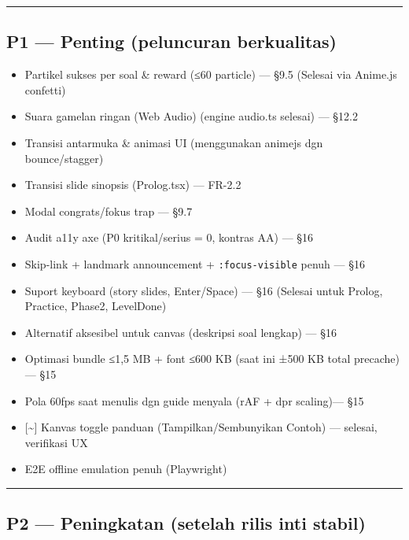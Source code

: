 \documentclass[
  11pt,
]{article}
\providecommand{\tightlist}{%
  \setlength{\itemsep}{0pt}\setlength{\parskip}{0pt}}
\begin{document}
\begin{center}\rule{0.5\linewidth}{0.5pt}\end{center}

\subsection{P1 --- Penting (peluncuran
berkualitas)}\label{p1-penting-peluncuran-berkualitas}

\begin{itemize}
\tightlist
\item[$\boxtimes$]
  Partikel sukses per soal \& reward (≤60 particle) --- §9.5 (Selesai
  via Anime.js confetti)
\item[$\boxtimes$]
  Suara gamelan ringan (Web Audio) (engine audio.ts selesai) --- §12.2
\item[$\boxtimes$]
  Transisi antarmuka \& animasi UI (menggunakan animejs dgn
  bounce/stagger)
\item[$\boxtimes$]
  Transisi slide sinopsis (Prolog.tsx) --- FR-2.2
\item[$\square$]
  Modal congrats/fokus trap --- §9.7
\item[$\boxtimes$]
  Audit a11y axe (P0 kritikal/serius = 0, kontras AA) --- §16
\item[$\boxtimes$]
  Skip-link + landmark announcement + \texttt{:focus-visible} penuh ---
  §16
\item[$\boxtimes$]
  Suport keyboard (story slides, Enter/Space) --- §16 (Selesai untuk
  Prolog, Practice, Phase2, LevelDone)
\item[$\square$]
  Alternatif aksesibel untuk canvas (deskripsi soal lengkap) --- §16
\item[$\square$]
  Optimasi bundle ≤1,5 MB + font ≤600 KB (saat ini ±500 KB total
  precache) --- §15
\item[$\square$]
  Pola 60fps saat menulis dgn guide menyala (rAF + dpr scaling)--- §15
\item
  {[}\textasciitilde{]} Kanvas toggle panduan (Tampilkan/Sembunyikan
  Contoh) --- selesai, verifikasi UX
\item[$\square$]
  E2E offline emulation penuh (Playwright)
\end{itemize}

\begin{center}\rule{0.5\linewidth}{0.5pt}\end{center}

\subsection{P2 --- Peningkatan (setelah rilis inti
stabil)}\label{p2-peningkatan-setelah-rilis-inti-stabil}
\end{document}
